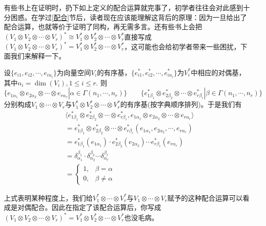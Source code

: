 有些书上在证明时，扔下如上定义的配合运算就完事了，初学者往往会对此感到十分困惑。在学过\ref{配合}节后，读者现在应该能理解这背后的原理：因为一旦给出了配合运算，也就等价于证明了同构，再无需多言。还有些书上会把$(V_{1}\otimes V_{2}\otimes \cdots\otimes V_{r})^{\ast}\cong V_{1}^{\ast}\otimes V_{2}^{\ast}\otimes \cdots\otimes V_{r}^{\ast}$直接写成$(V_{1}\otimes V_{2}\otimes \cdots\otimes V_{r})^{\ast}= V_{1}^{\ast}\otimes V_{2}^{\ast}\otimes \cdots\otimes V_{r}^{\ast}$，这可能也会给初学者带来一些困扰，下面我们来解释一下。

设$\{e_{i1},e_{i2},\cdots,e_{in_{i}} \}$为向量空间$V_{i}$的有序基，$\{e^{\ast}_{i1},e^{\ast}_{i2},\cdots,e^{\ast}_{in_{i}} \}$为$V^{\ast}_{i}$中相应的对偶基，其中$n_{i}=\operatorname{dim}(V_{i}),1\leqslant i\leqslant r$. 则
\[
\{e_{1\alpha_{ 1 }}\otimes e_{2\alpha_{ 2 }}\otimes\cdots\otimes e_{r\alpha_{ r }}|\alpha\in \Gamma(n_{1},\cdots,n_{r}) \}\quad\quad \{e^{\ast}_{1\beta_{ 1 }}\otimes e^{\ast}_{2\beta_{ 2 }}\otimes\cdots\otimes e^{\ast}_{r\beta_{ r }} |\beta\in \Gamma(n_{1},\cdots,n_{r})\}
\]
分别构成$V_{1}\otimes \cdots\otimes V_{r}$与$V^{\ast}_{1}\otimes V^{\ast}_{2}\otimes\cdots\otimes V^{\ast}_{r}$的有序基(按字典顺序排列)。于是我们有
\begin{equation}
\begin{split}
	&\langle e^{\ast}_{1\beta_{ 1 }}\otimes e^{\ast}_{2\beta_{ 2 }}\otimes\cdots\otimes e^{\ast}_{r\beta_{ r }},e_{1\alpha_{ 1 }}\otimes e_{2\alpha_{ 2 }}\otimes\cdots\otimes e_{r\alpha_{ r }}\rangle\\
	&=e^{\ast}_{1\beta_{ 1 }}\otimes e^{\ast}_{2\beta_{ 2 }}\otimes\cdots\otimes e^{\ast}_{r\beta_{ r }}\left(e_{1\alpha_{ 1 }}, e_{2\alpha_{ 2 }},\cdots, e_{r\alpha_{ r }} \right)\\
	&=e^{\ast}_{1\beta_{ 1 }}(e_{1\alpha_{ 1 }})\cdot e^{\ast}_{2\beta_{ 2 }}(e_{2\alpha_{ 2 }})\cdots e^{\ast}_{r\beta_{ r }}(e_{r\alpha_{ r}})\\
	&=\delta^{\beta_{1}}_{\alpha_{1}}\cdot \delta^{\beta_{2}}_{\alpha_{2}}\cdots\delta^{\beta_{r}}_{\alpha_{r}}\\
	&=\begin{cases}
		1 ,&\beta=\alpha\\
		0 ,&\beta\neq \alpha
	  \end{cases}
\end{split}
\label{对偶配合性质}
\end{equation}

上式表明某种程度上，我们给$V_{1}^{\ast}\otimes  \cdots\otimes V_{r}^{\ast}$与$V_{1}\otimes \cdots\otimes V_{r}$赋予的这种配合运算可以看成是对偶配合。因此在指定了该配合运算后，你写成$(V_{1}\otimes V_{2}\otimes \cdots\otimes V_{r})^{\ast}= V_{1}^{\ast}\otimes V_{2}^{\ast}\otimes \cdots\otimes V_{r}^{\ast}$也没毛病。

